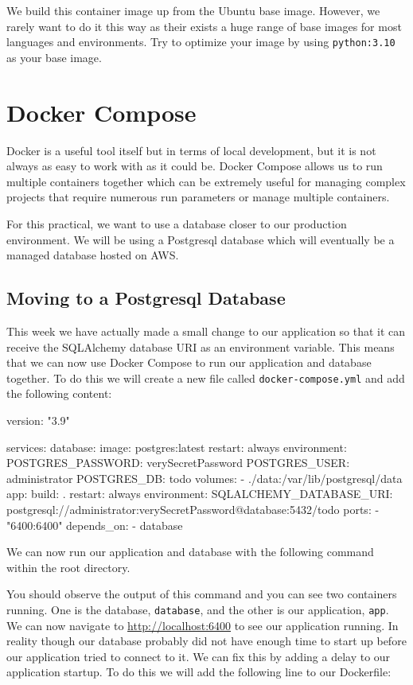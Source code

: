\documentclass{csse4400}
\begin{document}
We build this container image up from the Ubuntu base image.
However, we rarely want to do it this way as their exists a huge range of base images for most languages and environments.
Try to optimize your image by using \texttt{python:3.10} as your base image.

\section{Docker Compose}

Docker is a useful tool itself but in terms of local development,
but it is not always as easy to work with as it could be.
Docker Compose allows us to run multiple containers together which can be extremely useful for managing complex projects that require numerous run parameters or manage multiple containers.

For this practical, we want to use a database closer to our production environment.
We will be using a Postgresql database which will eventually be a managed database hosted on AWS.

\subsection{Moving to a Postgresql Database}

This week we have actually made a small change to our application so that it can receive the SQLAlchemy database URI as an environment variable.
This means that we can now use Docker Compose to run our application and database together.
To do this we will create a new file called \texttt{docker-compose.yml} and add the following content:

\begin{code}[numbers=none]{}
version: "3.9"

services:
database:
  image: postgres:latest
  restart: always
  environment:
    POSTGRES_PASSWORD: verySecretPassword
    POSTGRES_USER: administrator
    POSTGRES_DB: todo
  volumes:
    - ./data:/var/lib/postgresql/data
app:
  build: .
  restart: always
  environment:
    SQLALCHEMY_DATABASE_URI: postgresql://administrator:verySecretPassword@database:5432/todo
  ports:
    - "6400:6400"
  depends_on:
    - database
\end{code}

We can now run our application and database with the following command within the root directory.


You should observe the output of this command and you can see two containers running.
One is the database, \texttt{database}, and the other is our application, \texttt{app}.
We can now navigate to \url{http://localhost:6400} to see our application running.
In reality though our database probably did not have enough time to start up before our application tried to connect to it.
We can fix this by adding a delay to our application startup.
To do this we will add the following line to our Dockerfile:
\end{document}
